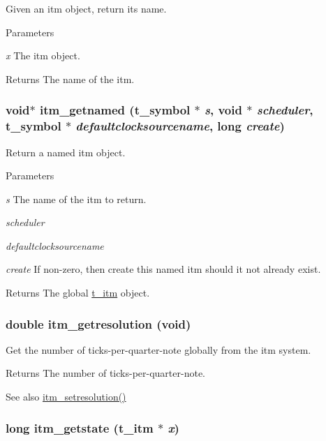 Given an itm object, return its name. 
\begin{DoxyParams}{Parameters}
\item[{\em x}]The itm object. \end{DoxyParams}
\begin{DoxyReturn}{Returns}
The name of the itm. 
\end{DoxyReturn}
\hypertarget{group__time_ga04a193f71ceaf7ce604e976a3affc99b}{
\subsubsection[{itm\_\-getnamed}]{\setlength{\rightskip}{0pt plus 5cm}void$\ast$ itm\_\-getnamed ({\bf t\_\-symbol} $\ast$ {\em s}, \/  void $\ast$ {\em scheduler}, \/  {\bf t\_\-symbol} $\ast$ {\em defaultclocksourcename}, \/  long {\em create})}}
\label{group__time_ga04a193f71ceaf7ce604e976a3affc99b}


Return a named itm object. 
\begin{DoxyParams}{Parameters}
\item[{\em s}]The name of the itm to return. \item[{\em scheduler}]\item[{\em defaultclocksourcename}]\item[{\em create}]If non-\/zero, then create this named itm should it not already exist. \end{DoxyParams}
\begin{DoxyReturn}{Returns}
The global \hyperlink{group__time_gac656fa1f920c69cf77e6631bcec53077}{t\_\-itm} object. 
\end{DoxyReturn}
\hypertarget{group__time_gaba77c4fbb00c349342b6358d80644113}{
\subsubsection[{itm\_\-getresolution}]{\setlength{\rightskip}{0pt plus 5cm}double itm\_\-getresolution (void)}}
\label{group__time_gaba77c4fbb00c349342b6358d80644113}


Get the number of ticks-\/per-\/quarter-\/note globally from the itm system. \begin{DoxyReturn}{Returns}
The number of ticks-\/per-\/quarter-\/note. 
\end{DoxyReturn}
\begin{DoxySeeAlso}{See also}
\hyperlink{group__time_gac777d53869fe6e01bdce0c34f868f648}{itm\_\-setresolution()} 
\end{DoxySeeAlso}
\hypertarget{group__time_ga36ee91bc9951d71880a055445ecd7ba7}{
\subsubsection[{itm\_\-getstate}]{\setlength{\rightskip}{0pt plus 5cm}long itm\_\-getstate ({\bf t\_\-itm} $\ast$ {\em x})}}
\label{group__time_ga36ee91bc9951d71880a055445ecd7ba7}


